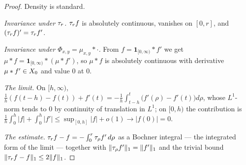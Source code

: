 \begin{proof}
\leanok
Density is standard.

\emph{Invariance under $\tau_r$.} $\tau_r f$ is absolutely continuous, vanishes on $[0, r]$, and
$(\tau_r f)' = \tau_r f'$.

\emph{Invariance under $\Phi_{x,y} = \mu_{x,y} * \cdot$.} From $f = \mathbf{1}_{[0,\infty)} * f'$
we get $\mu * f = \mathbf{1}_{[0,\infty)} * (\mu * f')$, so $\mu * f$ is absolutely continuous
with derivative $\mu * f' \in X_0$ and value $0$ at $0$.

\emph{The limit.} On $[h, \infty)$,
$\tfrac{1}{h}(f(t-h) - f(t)) + f'(t) = -\tfrac{1}{h}\int_{t-h}^{t}\bigl(f'(\rho) - f'(t)\bigr)d\rho$,
whose $L^1$-norm tends to $0$ by continuity of translation in $L^1$; on $[0, h)$ the
contribution is $\tfrac{1}{h}\int_0^h |f| + \int_0^h |f'| \le \sup_{[0,h]}|f| + o(1) \to
|f(0)| = 0$.

\emph{The estimate.} $\tau_r f - f = -\int_0^r \tau_\rho f'\,d\rho$ as a Bochner integral --- the
integrated form of the limit --- together with $\|\tau_\rho f'\|_1 = \|f'\|_1$ and the trivial
bound $\|\tau_rf - f\|_1 \le 2\|f\|_1$.
\end{proof}

